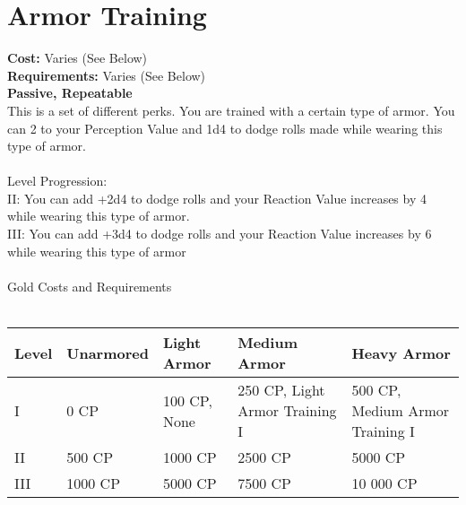 \section{Armor Training}
\textbf{Cost:} Varies (See Below)\\
\textbf{Requirements:} Varies (See Below)\\
\textbf{Passive, Repeatable}\\
This is a set of different perks. You are trained with a certain type of armor. You can 2 to your Perception Value and 1d4 to dodge rolls made while wearing this type of armor.\\
\\
Level Progression:\\
II: You can add +2d4 to dodge rolls and your Reaction Value increases by 4 while wearing this type of armor.\\
III: You can add +3d4 to dodge rolls and your Reaction Value increases by 6 while wearing this type of armor\\
\\
Gold Costs and Requirements\\
\\
\begin{tabular}{l | p{2cm} | p{2.4cm} | p{2.6cm} | p{2.6cm}}
	Level & Unarmored & Light Armor & Medium Armor & Heavy Armor\\ \hline
	I & 0 CP & 100 CP, None & 250 CP, Light Armor Training I & 500 CP, Medium Armor Training I\\
	II & 500 CP& 1000 CP & 2500 CP & 5000 CP\\
	III & 1000 CP& 5000 CP & 7500 CP & 10 000 CP\\
\end{tabular}